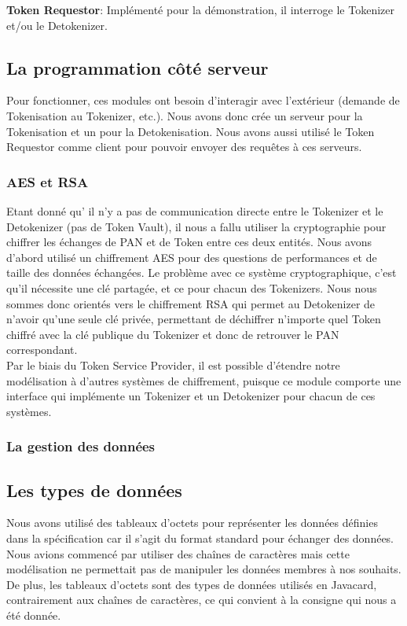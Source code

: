 \documentclass{report}
\begin{document}
\noindent
\textbf{Token Requestor}: Implémenté pour la démonstration, il interroge le Tokenizer et/ou le Detokenizer.

\subsection{La programmation côté serveur}
Pour fonctionner, ces modules ont besoin d'interagir avec l'extérieur (demande de Tokenisation au Tokenizer, etc.). Nous avons donc crée un serveur pour la Tokenisation et un pour la Detokenisation. Nous avons aussi utilisé le Token Requestor comme client pour pouvoir envoyer des requêtes à ces serveurs.

\subsubsection{AES et RSA}
Etant donné qu' il n'y a pas de communication directe entre le Tokenizer et le Detokenizer (pas de Token Vault), il nous a fallu utiliser la cryptographie pour chiffrer les échanges de PAN et de Token entre ces deux entités. Nous avons d'abord utilisé un chiffrement AES pour des questions de performances et de taille des données échangées. Le problème avec ce système cryptographique, c'est qu'il nécessite une clé partagée, et ce pour chacun des Tokenizers. Nous nous sommes donc orientés vers le chiffrement RSA qui permet au Detokenizer de n'avoir qu'une seule clé privée, permettant de déchiffrer n'importe quel Token chiffré avec la clé publique du Tokenizer et donc de retrouver le PAN correspondant.\\
Par le biais du Token Service Provider, il est possible d'étendre notre modélisation à d'autres systèmes de chiffrement, puisque ce module comporte une interface qui implémente un Tokenizer et un Detokenizer pour chacun de ces systèmes.

\subsubsection{La gestion des données}

\subsection{Les types de données}
Nous avons utilisé des tableaux d'octets pour représenter les données définies dans la spécification car il s'agit du format standard pour échanger des données. Nous avions commencé par utiliser des chaînes de caractères mais cette modélisation ne permettait pas de manipuler les données membres à nos souhaits.\\
De plus, les tableaux d'octets sont des types de données utilisés en Javacard, contrairement aux chaînes de caractères, ce qui convient à la consigne qui nous a été donnée.
\end{document}
